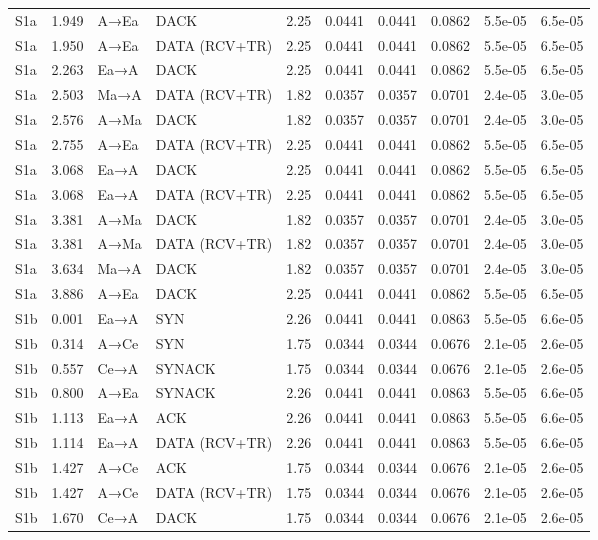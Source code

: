 \documentclass[10pt,letterpaper]{article}
\begin{document}
{\begin{longtable}{@{}lrllrrrrrr@{}}
S1a & 1.949 & A→Ea & DACK & 2.25 & 0.0441 & 0.0441 & 0.0862 & 5.5e-05 & 6.5e-05 \\
S1a & 1.950 & A→Ea & DATA (RCV+TR) & 2.25 & 0.0441 & 0.0441 & 0.0862 & 5.5e-05 & 6.5e-05 \\
S1a & 2.263 & Ea→A & DACK & 2.25 & 0.0441 & 0.0441 & 0.0862 & 5.5e-05 & 6.5e-05 \\
S1a & 2.503 & Ma→A & DATA (RCV+TR) & 1.82 & 0.0357 & 0.0357 & 0.0701 & 2.4e-05 & 3.0e-05 \\
S1a & 2.576 & A→Ma & DACK & 1.82 & 0.0357 & 0.0357 & 0.0701 & 2.4e-05 & 3.0e-05 \\
S1a & 2.755 & A→Ea & DATA (RCV+TR) & 2.25 & 0.0441 & 0.0441 & 0.0862 & 5.5e-05 & 6.5e-05 \\
S1a & 3.068 & Ea→A & DACK & 2.25 & 0.0441 & 0.0441 & 0.0862 & 5.5e-05 & 6.5e-05 \\
S1a & 3.068 & Ea→A & DATA (RCV+TR) & 2.25 & 0.0441 & 0.0441 & 0.0862 & 5.5e-05 & 6.5e-05 \\
S1a & 3.381 & A→Ma & DACK & 1.82 & 0.0357 & 0.0357 & 0.0701 & 2.4e-05 & 3.0e-05 \\
S1a & 3.381 & A→Ma & DATA (RCV+TR) & 1.82 & 0.0357 & 0.0357 & 0.0701 & 2.4e-05 & 3.0e-05 \\
S1a & 3.634 & Ma→A & DACK & 1.82 & 0.0357 & 0.0357 & 0.0701 & 2.4e-05 & 3.0e-05 \\
S1a & 3.886 & A→Ea & DACK & 2.25 & 0.0441 & 0.0441 & 0.0862 & 5.5e-05 & 6.5e-05 \\
S1b & 0.001 & Ea→A & SYN & 2.26 & 0.0441 & 0.0441 & 0.0863 & 5.5e-05 & 6.6e-05 \\
S1b & 0.314 & A→Ce & SYN & 1.75 & 0.0344 & 0.0344 & 0.0676 & 2.1e-05 & 2.6e-05 \\
S1b & 0.557 & Ce→A & SYNACK & 1.75 & 0.0344 & 0.0344 & 0.0676 & 2.1e-05 & 2.6e-05 \\
S1b & 0.800 & A→Ea & SYNACK & 2.26 & 0.0441 & 0.0441 & 0.0863 & 5.5e-05 & 6.6e-05 \\
S1b & 1.113 & Ea→A & ACK & 2.26 & 0.0441 & 0.0441 & 0.0863 & 5.5e-05 & 6.6e-05 \\
S1b & 1.114 & Ea→A & DATA (RCV+TR) & 2.26 & 0.0441 & 0.0441 & 0.0863 & 5.5e-05 & 6.6e-05 \\
S1b & 1.427 & A→Ce & ACK & 1.75 & 0.0344 & 0.0344 & 0.0676 & 2.1e-05 & 2.6e-05 \\
S1b & 1.427 & A→Ce & DATA (RCV+TR) & 1.75 & 0.0344 & 0.0344 & 0.0676 & 2.1e-05 & 2.6e-05 \\
S1b & 1.670 & Ce→A & DACK & 1.75 & 0.0344 & 0.0344 & 0.0676 & 2.1e-05 & 2.6e-05 \\

\end{longtable}}
\end{document}
